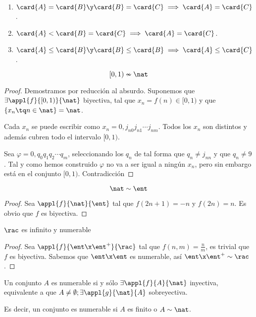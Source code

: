\documentclass[nochap]{apuntes}
\begin{document}
\begin{prop}

\begin{enumerate}
\item $\card{A}=\card{B} \y \card{B}=\card{C} \implies \card{A}=\card{C}$.
\item $\card{A}<\card{B}=\card{C} \implies \card{A}=\card{C}$.
\item $\card{A}\leq \card{B} \y \card{B} \leq \card{B} \implies \card{A} \leq \card{C}$.
\end{enumerate}
\end{prop}

\begin{theorem}
\[ [0,1) \nsim \nat \]
\end{theorem}

\begin{proof}
Demostramos por reducción al absurdo. Suponemos que $\exists \appl{f}{[0,1)}{\nat}$ biyectiva, tal que $x_n=f(n)\in [0,1)$ y que $\{x_n\tq n\in \nat\} = \nat$.

Cada $x_n$ se puede escribir como $x_n=0,j_{n0}j_{n1}\cdots j_{nm}$. Todos los $x_n$ son distintos y además cubren todo el intervalo $[0,1)$. 

Sea $\varphi=0,q_0q_1q_2\cdots q_m$, seleccionando los $q_n$ de tal forma que $q_n \neq j_{nn}$ y que $q_n \neq 9$. Tal y como hemos construido $\varphi$ no va a ser igual a ningún $x_n$, pero sin embargo está en el conjunto $[0,1)$. Contradicción
\end{proof}

\begin{prop}\[\nat \sim \ent\]\end{prop}

\begin{proof}
Sea $\appl{f}{\nat}{\ent}$ tal que $f(2n+1)=-n$ y $f(2n)=n$. Es obvio que $f$ es biyectiva. 
\end{proof}

\begin{prop}$\rac$ es infinito y numerable\end{prop}

\begin{proof}
Sea $\appl{f}{\ent\x\ent^{+}}{\rac}$ tal que $f(n,m)=\frac{n}{m}$, es trivial que $f$ es biyectiva. Sabemos que $\ent\x\ent$ es numerable, así $\ent\x\ent^+\sim \rac$.
\end{proof}

\begin{defn}
Un conjunto $A$ es numerable si y sólo $\exists \appl{f}{A}{\nat}$ inyectiva, equivalente a que $A\neq \emptyset ; \exists \appl{g}{\nat}{A}$ sobreyectiva.

Es decir, un conjunto es numerable si $A$ es finito o $A\sim \nat$.
\end{defn}
\end{document}
